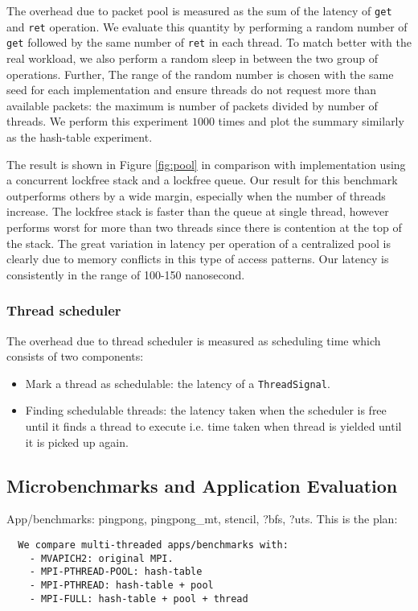 The overhead due to packet pool is measured as the sum of the latency of
\texttt{get} and \texttt{ret} operation. We evaluate this quantity by
performing a random number of \texttt{get} followed by the same number of
\texttt{ret} in each thread. To match better with the real workload, we also
perform a random sleep in between the two group of operations. Further, The
range of the random number is chosen with the same seed for each implementation
and ensure threads do not request more than available packets: the maximum is
number of packets divided by number of threads. We perform this experiment
$1000$ times and plot the summary similarly as  the hash-table experiment.

The result is shown in Figure \ref{fig:pool} in comparison with implementation
using a concurrent lockfree stack and a lockfree queue. Our result for this
benchmark outperforms others by a wide margin, especially when the number of
threads increase. The lockfree stack is faster than the queue at single thread,
however performs worst for more than two threads since there is contention at
the top of the stack. The great variation in latency per operation of a
centralized pool is clearly due to memory conflicts in this type of access
patterns. Our latency is consistently in the range of 100-150 nanosecond.

\subsubsection{Thread scheduler}
The overhead due to thread scheduler is measured as scheduling time which consists
of two components:
\begin{itemize}
    \item Mark a thread as schedulable: the latency of a \texttt{ThreadSignal}.
    \item Finding schedulable threads: the latency taken when the scheduler is free
      until it finds a thread to execute i.e. time taken when thread is yielded until
      it is picked up again.
\end{itemize}

\subsection{Microbenchmarks and Application Evaluation}
App/benchmarks: pingpong, pingpong_mt, stencil, ?bfs, ?uts.
This is the plan:
  \begin{verbatim}
  We compare multi-threaded apps/benchmarks with:
    - MVAPICH2: original MPI.
    - MPI-PTHREAD-POOL: hash-table
    - MPI-PTHREAD: hash-table + pool
    - MPI-FULL: hash-table + pool + thread
  \end{verbatim}
